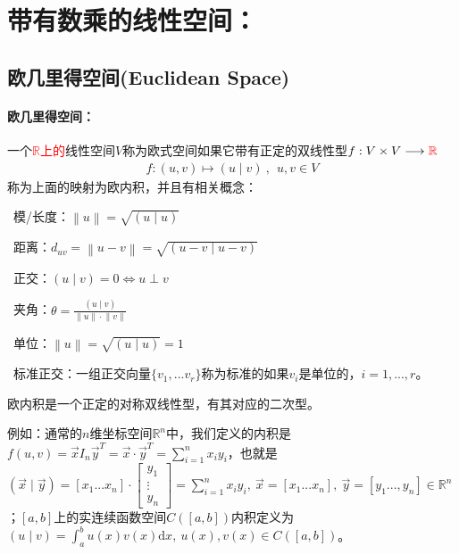 \documentclass[zihao=5,UTF8]{report}
\theoremstyle{mystyle} %
\begin{document}
\chapter{带有数乘的线性空间：}
\section{欧几里得空间(Euclidean Space)}
\subsubsection{欧几里得空间：}
一个\textcolor{red}{$\mathbb{R}$上的}线性空间$V$称为欧式空间如果它带有正定的双线性型$f: V\times V \longrightarrow \textcolor{red}{\mathbb{R}}$
\begin{gather*}
    f:(u,v) \longmapsto (u\mid v)\ ,\ \ u,v \in V    
\end{gather*}
称为上面的映射为欧内积，并且有相关概念：\par
{}\ 模/长度：$\left \| u \right \|  = \sqrt{(u\mid u)}$\par
{}\ 距离：$d_{uv} = \left \| u -v \right \| = \sqrt{(u-v\mid u-v)}$\par
{}\ 正交：$(u\mid v) = 0\Longleftrightarrow u \perp v $\par
{}\ 夹角：$\theta = \frac{(u\mid v)}{ \left \| u \right \|\cdot  \left \| v \right \|}$ \par
{}\ 单位：$ \left \| u \right \| = \sqrt{(u\mid u) } = 1$\par
{}\ 标准正交：一组正交向量$\{v_1,...v_r\}$称为标准的如果$v_i$是单位的，$i = 1,...,r$。

{\color{gray}\small 欧内积是一个正定的对称双线性型，有其对应的二次型。\par
例如：通常的$n$维坐标空间$\mathbb{R}^n$中，我们定义的内积是$f(u,v) = \vec{x}I_n\vec{y}^T = \vec{x}\cdot\vec{y}^T = \sum_{i=1}^{n}x_iy_i $，也就是$(\vec{x} \mid \vec{y}) = [x_1 ... x_n] \cdot 
\begin{bmatrix}
    y_1\\
    \vdots\\
    y_n
\end{bmatrix}
=\sum_{i = 1}^{n}x_iy_i,\ \vec{x} = [x_1 ... x_n],\ \vec{y} = [y_1...,y_n] \in \mathbb{R}^n$；$[a,b]$上的实连续函数空间$C([a,b])$内积定义为$(u \mid v) = \int_{a}^{b}u(x)v(x)\mathrm{d}x,\ u(x),v(x)\in C([a,b])$。}
\end{document}
